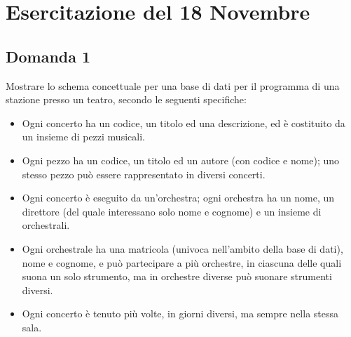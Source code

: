 \documentclass{article}
\numberwithin{equation}{subsection}
\begin{document}
\clearpage

\section{Esercitazione del 18 Novembre}

\subsection{Domanda 1}

Mostrare lo schema concettuale per una base di dati per il programma di una stazione presso un teatro, secondo le seguenti specifiche:
\begin{itemize}
    \item Ogni concerto ha un codice, un titolo ed una descrizione, ed è costituito da un insieme di pezzi musicali. 
    \item Ogni pezzo ha un codice, un titolo ed un autore (con codice e nome); uno stesso pezzo può essere rappresentato in diversi concerti. 
    \item Ogni concerto è eseguito da un'orchestra; ogni orchestra ha un nome, un direttore (del quale interessano solo nome e cognome) e un insieme di orchestrali. 
    \item Ogni orchestrale ha una matricola (univoca nell'ambito della base di dati), nome e cognome, e può partecipare a più orchestre, in ciascuna delle quali suona un solo strumento, ma in orchestre diverse può suonare strumenti diversi. 
    \item Ogni concerto è tenuto più volte, in giorni diversi, ma sempre nella stessa sala. 
\end{itemize}
\end{document}
